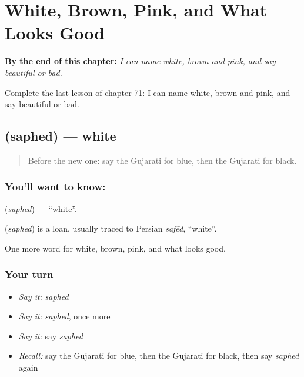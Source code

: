 
\chapter{White, Brown, Pink, and What Looks Good}
\label{ch:gu-white-brown-pink-and-what-looks-good}

\begin{chapteropening}
\textbf{By the end of this chapter:} \emph{I can name white, brown and pink, and say beautiful or bad.}

Complete the last lesson of chapter 71: I can name white, brown and pink, and say beautiful or bad.
\end{chapteropening}

\section[\texorpdfstring{\gu{સફેદ} (saphed)}{સફેદ (saphed)}]{ (saphed) — white}

\label{lesson:GU-C71-white}



\begin{quote}
Before the new one: say the Gujarati for blue, then the Gujarati for black.
\end{quote}

\subsection*{You'll want to know: }
\textbf{} (\emph{saphed}) — \textquotedblleft{}white\textquotedblright{}.

\begin{cousinweb}
\textbf{} (\emph{saphed}) is a loan, usually traced to Persian \emph{safēd}, \textquotedblleft{}white\textquotedblright{}.
\end{cousinweb}

\begin{grammarlens}[title={What you've built}]
One more word for white, brown, pink, and what looks good.
\end{grammarlens}

\subsection*{Your turn}
\begin{itemize}
\raggedright
  \item \emph{Say it:} \emph{saphed}
  \item \emph{Say it:} \emph{saphed}, once more
  \item \emph{Say it:} say \emph{saphed}
  \item \emph{Recall:} say the Gujarati for blue, then the Gujarati for black, then say \emph{saphed} again
\end{itemize}

